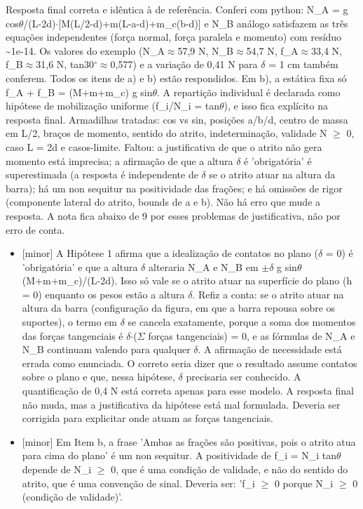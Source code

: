 \documentclass{article}%
\begin{document}
Resposta final correta e idêntica à de referência. Conferi com python: N\_A = g cos$\theta$/(L-2d)$\cdot${[}M(L/2-d)+m(L-a-d)+m\_c(b-d){]} e N\_B análogo satisfazem as três equações independentes (força normal, força paralela e momento) com resíduo \textasciitilde{}1e-14. Os valores do exemplo (N\_A$\approx$57,9 N, N\_B$\approx$54,7 N, f\_A$\approx$33,4 N, f\_B$\approx$31,6 N, tan30$^\circ$$\approx$0,577) e a variação de 0,41 N para $\delta$ = 1 cm também conferem. Todos os itens de a) e b) estão respondidos. Em b), a estática fixa só f\_A + f\_B = (M+m+m\_c) g sin$\theta$. A repartição individual é declarada como hipótese de mobilização uniforme (f\_i/N\_i = tan$\theta$), e isso fica explícito na resposta final. Armadilhas tratadas: cos vs sin, posições a/b/d, centro de massa em L/2, braços de momento, sentido do atrito, indeterminação, validade N $\geq$ 0, caso L = 2d e casos{-}limite. Faltou: a justificativa de que o atrito não gera momento está imprecisa; a afirmação de que a altura $\delta$ é 'obrigatória' é superestimada (a resposta é independente de $\delta$ se o atrito atuar na altura da barra); há um non sequitur na positividade das frações; e há omissões de rigor (componente lateral do atrito, bounds de a e b). Não há erro que mude a resposta. A nota fica abaixo de 9 por esses problemas de justificativa, não por erro de conta.%
\begin{itemize}%
\item%
{[}minor{]} A Hipótese 1 afirma que a idealização de contatos no plano ($\delta$ = 0) é 'obrigatória' e que a altura $\delta$ alteraria N\_A e N\_B em $\pm$$\delta$ g sin$\theta$ (M+m+m\_c)/(L-2d). Isso só vale se o atrito atuar na superfície do plano (h = 0) enquanto os pesos estão a altura $\delta$. Refiz a conta: se o atrito atuar na altura da barra (configuração da figura, em que a barra repousa sobre os suportes), o termo em $\delta$ se cancela exatamente, porque a soma dos momentos das forças tangenciais é $\delta$$\cdot$($\Sigma$ forças tangenciais) = 0, e as fórmulas de N\_A e N\_B continuam valendo para qualquer $\delta$. A afirmação de necessidade está errada como enunciada. O correto seria dizer que o resultado assume contatos sobre o plano e que, nessa hipótese, $\delta$ precisaria ser conhecido. A quantificação de 0,4 N está correta apenas para esse modelo. A resposta final não muda, mas a justificativa da hipótese está mal formulada. Deveria ser corrigida para explicitar onde atuam as forças tangenciais.%
\item%
{[}minor{]} Em Item b, a frase 'Ambas as frações são positivas, pois o atrito atua para cima do plano' é um non sequitur. A positividade de f\_i = N\_i tan$\theta$ depende de N\_i $\geq$ 0, que é uma condição de validade, e não do sentido do atrito, que é uma convenção de sinal. Deveria ser: 'f\_i $\geq$ 0 porque N\_i $\geq$ 0 (condição de validade)'.%

\end{itemize}$$
\end{document}
